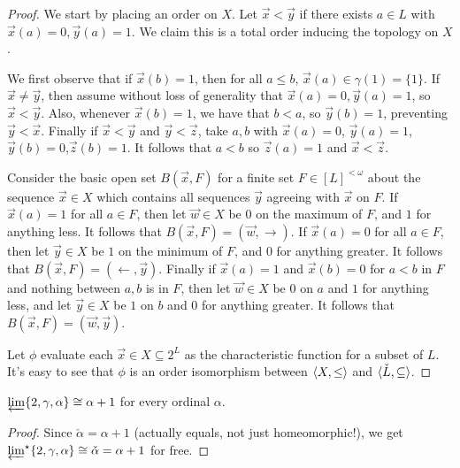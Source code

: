 \documentclass[11pt]{article}
\newcommand{\vect}{\vec}
\begin{document}
  \begin{proof}
    We start by placing an order on \(X\). Let \(\vect x<\vect y\) if
    there exists \(a\in L\) with \(\vect x(a)=0,\vect y(a)=1\). We claim this is
    a total order inducing the topology on \(X\).

    We first observe that if \(\vect x(b)=1\), then for all \(a\leq b\),
    \(\vect x(a)\in\gamma(1)=\{1\}\). If \(\vect x\not=\vect y\), then assume
    without loss of generality that \(\vect x(a)=0,\vect y(a)=1\), so
    \(\vect x<\vect y\). Also, whenever \(\vect x(b)=1\), we have that \(b<a\),
    so \(\vect y(b)=1\), preventing \(\vect y<\vect x\). Finally if
    \(\vect x<\vect y\) and \(\vect y<\vect z\), take \(a,b\) with
    \(\vect x(a)=0\), \(\vect y(a)=1\),\(\vect y(b)=0\),\(\vect z(b)=1\). It
    follows that \(a<b\) so \(\vect z(a)=1\) and \(\vect x<\vect z\).

    Consider the basic open set \(B(\vect x,F)\) for a finite set
    \(F\in [L]^{<\omega}\)
    about the sequence \(\vect x\in X\) which contains all sequences
    \(\vect y\) agreeing with \(\vect x\) on \(F\). If \(\vect x(a)=1\) for all
    \(a\in F\), then let \(\vect w\in X\) be \(0\) on the maximum of \(F\),
    and \(1\) for anything less. It follows that
    \(B(\vect x,F)=(\vect w,\rightarrow)\). If \(\vect x(a)=0\) for all
    \(a\in F\), then let \(\vect y\in X\) be \(1\) on the minimum of \(F\),
    and \(0\) for anything greater. It follows that
    \(B(\vect x,F)=(\leftarrow,\vect y)\). Finally if \(\vect x(a)=1\) and
    \(\vect x(b)=0\) for \(a<b\) in \(F\) and nothing between \(a,b\) is in
    \(F\), then let \(\vect w\in X\) be \(0\) on \(a\)
    and \(1\) for anything less, and let \(\vect y\in X\) be \(1\) on \(b\)
    and \(0\) for anything greater. It follows that
    \(B(\vect x,F)=(\vect w,\vect y)\).

    Let \(\phi\) evaluate each \(\vect x\in X\subseteq 2^L\) as the
    characteristic function for a subset of \(L\). It's easy to see that
    \(\phi\) is an order isomorphism between \(\langle X,\leq\rangle\) and
    \(\langle\check L,\subseteq\rangle\).
  \end{proof}

  \begin{corollary}
    \(
      \varprojlim \{2, \gamma, \alpha\}
      \cong
      \alpha+1
    \)
    for every ordinal \(\alpha\).
  \end{corollary}

  \begin{proof}
    Since \(\check\alpha=\alpha+1\) (actually equals, not just homeomorphic!),
    we get \(\varprojlim^\star \{2, \gamma, \alpha\}
      \cong \check\alpha =
    \alpha+1\) for free.
  \end{proof}
\end{document}
